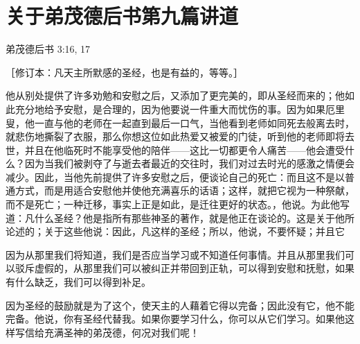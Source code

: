 

\section{关于弟茂德后书第九篇讲道}

弟茂德后书 3:16, 17\par

［修订本：凡天主所默感的圣经，也是有益的，等等。］\par

他从别处提供了许多劝勉和安慰之后，又添加了更完美的，即从圣经而来的；他如此充分地给予安慰，是合理的，因为他要说一件重大而忧伤的事。因为如果厄里叟，他一直与他的老师在一起直到最后一口气，当他看到老师如同死去般离去时，就悲伤地撕裂了衣服，那么你想这位如此热爱又被爱的门徒，听到他的老师即将去世，并且在他临死时不能享受他的陪伴——这比一切都更令人痛苦——他会遭受什么？因为当我们被剥夺了与逝去者最近的交往时，我们对过去时光的感激之情便会减少。因此，当他先前提供了许多安慰之后，便谈论自己的死亡：而且这不是以普通方式，而是用适合安慰他并使他充满喜乐的话语；这样，就把它视为一种祭献，而不是死亡；一种迁移，事实上正是如此，是迁往更好的状态。，他说。为此他写道：凡什么圣经？他是指所有那些神圣的著作，就是他正在谈论的。这是关于他所论述的；关于这些他说：因此，凡这样的圣经；所以，他说，不要怀疑；并且它\par

因为从那里我们将知道，我们是否应当学习或不知道任何事情。并且从那里我们可以驳斥虚假的，从那里我们可以被纠正并带回到正轨，可以得到安慰和抚慰，如果有什么缺乏，我们可以得到补足。\par

因为圣经的鼓励就是为了这个，使天主的人藉着它得以完备；因此没有它，他不能完备。他说，你有圣经代替我。如果你要学习什么，你可以从它们学习。如果他这样写信给充满圣神的弟茂德，何况对我们呢！\par

